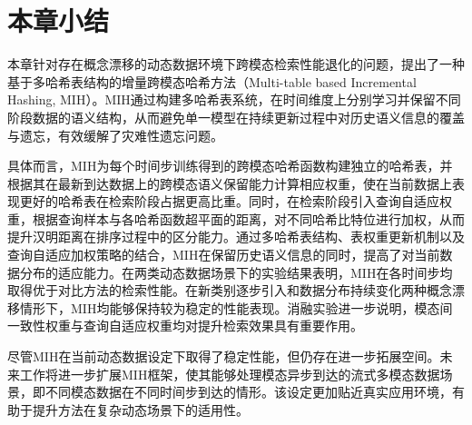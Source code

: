 \section{本章小结}
本章针对存在概念漂移的动态数据环境下跨模态检索性能退化的问题，提出了一种基于多哈希表结构的增量跨模态哈希方法（Multi-table based Incremental Hashing, MIH）。MIH通过构建多哈希表系统，在时间维度上分别学习并保留不同阶段数据的语义结构，从而避免单一模型在持续更新过程中对历史语义信息的覆盖与遗忘，有效缓解了灾难性遗忘问题。

具体而言，MIH为每个时间步训练得到的跨模态哈希函数构建独立的哈希表，并根据其在最新到达数据上的跨模态语义保留能力计算相应权重，使在当前数据上表现更好的哈希表在检索阶段占据更高比重。同时，在检索阶段引入查询自适应权重，根据查询样本与各哈希函数超平面的距离，对不同哈希比特位进行加权，从而提升汉明距离在排序过程中的区分能力。通过多哈希表结构、表权重更新机制以及查询自适应加权策略的结合，MIH在保留历史语义信息的同时，提高了对当前数据分布的适应能力。在两类动态数据场景下的实验结果表明，MIH在各时间步均取得优于对比方法的检索性能。在新类别逐步引入和数据分布持续变化两种概念漂移情形下，MIH均能够保持较为稳定的性能表现。消融实验进一步说明，模态间一致性权重与查询自适应权重均对提升检索效果具有重要作用。

尽管MIH在当前动态数据设定下取得了稳定性能，但仍存在进一步拓展空间。未来工作将进一步扩展MIH框架，使其能够处理模态异步到达的流式多模态数据场景，即不同模态数据在不同时间步到达的情形。该设定更加贴近真实应用环境，有助于提升方法在复杂动态场景下的适用性。
